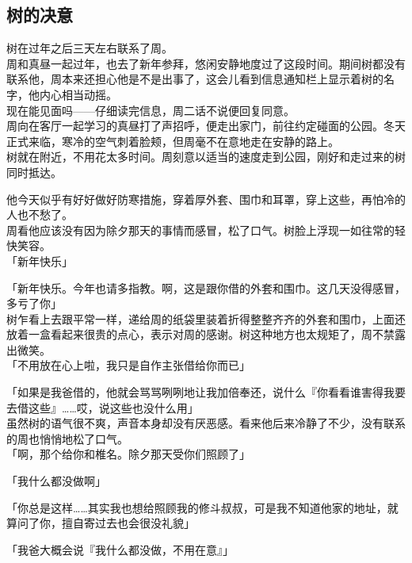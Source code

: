 \subsection{树的决意}

树在过年之后三天左右联系了周。\\

周和真昼一起过年，也去了新年参拜，悠闲安静地度过了这段时间。期间树都没有联系他，周本来还担心他是不是出事了，这会儿看到信息通知栏上显示着树的名字，他内心相当动摇。\\

现在能见面吗——仔细读完信息，周二话不说便回复同意。\\

周向在客厅一起学习的真昼打了声招呼，便走出家门，前往约定碰面的公园。冬天正式来临，寒冷的空气刺着脸颊，但周毫不在意地走在安静的路上。\\

树就在附近，不用花太多时间。周刻意以适当的速度走到公园，刚好和走过来的树同时抵达。

他今天似乎有好好做好防寒措施，穿着厚外套、围巾和耳罩，穿上这些，再怕冷的人也不愁了。\\

周看他应该没有因为除夕那天的事情而感冒，松了口气。树脸上浮现一如往常的轻快笑容。\\

「新年快乐」

「新年快乐。今年也请多指教。啊，这是跟你借的外套和围巾。这几天没得感冒，多亏了你」\\

树乍看上去跟平常一样，递给周的纸袋里装着折得整整齐齐的外套和围巾，上面还放着一盒看起来很贵的点心，表示对周的感谢。树这种地方也太规矩了，周不禁露出微笑。\\

「不用放在心上啦，我只是自作主张借给你而已」

「如果是我爸借的，他就会骂骂咧咧地让我加倍奉还，说什么『你看看谁害得我要去借这些』……哎，说这些也没什么用」\\

虽然树的语气很不爽，声音本身却没有厌恶感。看来他后来冷静了不少，没有联系的周也悄悄地松了口气。\\

「啊，那个给你和椎名。除夕那天受你们照顾了」

「我什么都没做啊」

「你总是这样……其实我也想给照顾我的修斗叔叔，可是我不知道他家的地址，就算问了你，擅自寄过去也会很没礼貌」

「我爸大概会说『我什么都没做，不用在意』」

